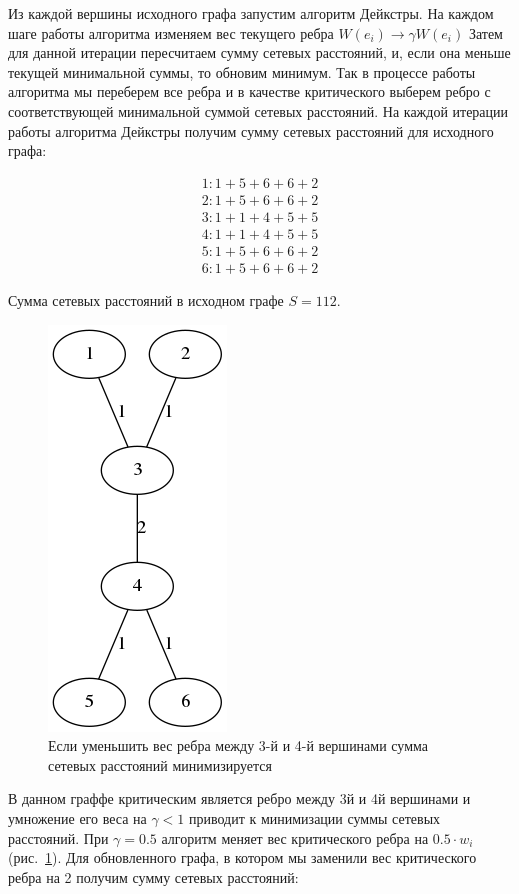 \documentclass[12pt]{article}
\begin{document}
Из каждой вершины исходного графа запустим алгоритм Дейкстры.
На каждом шаге работы алгоритма изменяем вес текущего ребра $W(e_i) \rightarrow \gamma W(e_i)$
Затем для данной итерации пересчитаем сумму сетевых расстояний, и, если она меньше текущей минимальной суммы,
то обновим минимум. Так в процессе работы алгоритма мы переберем все ребра и в качестве критического выберем 
ребро с соответствующей минимальной суммой сетевых расстояний. 
На каждой итерации работы алгоритма Дейкстры получим сумму сетевых расстояний для исходного графа:

\begin{gather}
1 : 1 + 5 + 6 + 6 + 2 \\
2 : 1 + 5 + 6 + 6 + 2 \\
3 : 1 + 1 + 4 + 5 + 5 \\
4 : 1 + 1 + 4 + 5 + 5 \\
5 : 1 + 5 + 6 + 6 + 2 \\
6 : 1 + 5 + 6 + 6 + 2
\end{gather}

Сумма сетевых расстояний в исходном графе $S = 112$. 

\begin{figure}[h]
    \centering
    \includegraphics[scale=0.7]{min_graph_2.png}
    \caption{Если уменьшить вес ребра между 3-й и 4-й вершинами сумма сетевых расстояний минимизируется}
    \label{fig:min_graph_2}
\end{figure}

В данном граффе критическим является ребро между
3й и 4й вершинами и умножение его веса на
$\gamma < 1$ приводит к минимизации суммы сетевых расстояний.
При $\gamma = 0.5$ алгоритм меняет вес критического ребра на $0.5 \cdot w_i$ (рис.~\ref{fig:min_graph_2}).
Для обновленного графа, в котором мы заменили вес критического ребра на 2 получим сумму сетевых расстояний:
\end{document}
